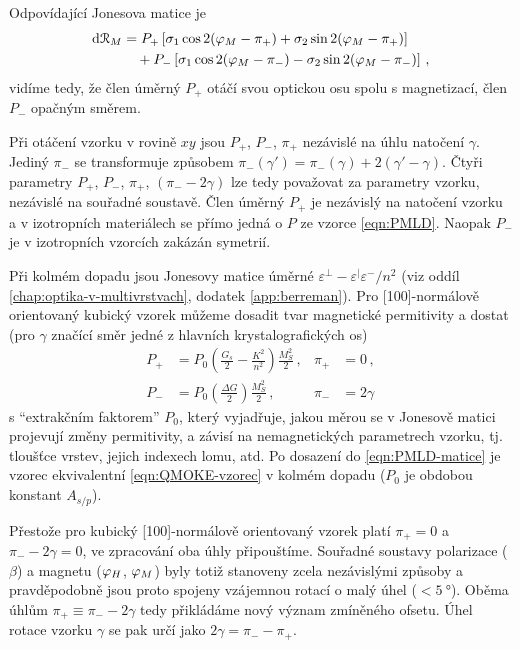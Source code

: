 Odpovídající Jonesova matice je 
\begin{equation}
    \label{eqn:dR-kubicky}
    \begin{split}
        \textrm{d}\mathcal{R}_M &= P_+ \left[\sigma_1\cos2(\varphi_M-\pi_+) + \sigma_2 \sin2(\varphi_M-\pi_+)\right] \\ 
                              & \quad+ P_- \left[\sigma_1\cos2(\varphi_M-\pi_-) - \sigma_2 \sin2(\varphi_M-\pi_-) \right] \,,
\end{split}
\end{equation}
vidíme tedy, že člen úměrný $P_+$ otáčí svou optickou osu spolu s magnetizací, člen $P_-$ opačným směrem.

Při otáčení vzorku v rovině $xy$ jsou $P_+$, $P_-$, $\pi_+$ nezávislé na úhlu natočení $\gamma$.
Jediný $\pi_-$ se transformuje způsobem $\pi_-(\gamma')=\pi_-(\gamma)+2(\gamma'-\gamma)$.
Čtyři parametry $P_+$, $P_-$, $\pi_+$, $(\pi_--2\gamma)$ lze tedy považovat za parametry vzorku, nezávislé na souřadné soustavě.
Člen úměrný $P_+$ je nezávislý na natočení vzorku a v izotropních materiálech se přímo jedná o $P$ ze vzorce \ref{eqn:PMLD}.
Naopak $P_-$ je v izotropních vzorcích zakázán symetrií.

Při kolmém dopadu jsou Jonesovy matice úměrné $\varepsilon^\perp-\varepsilon^\vert\varepsilon^-/n^2$ (viz oddíl \ref{chap:optika-v-multivrstvach}, dodatek \ref{app:berreman}).
Pro [100]-normálově orientovaný kubický vzorek můžeme dosadit tvar magnetické permitivity a dostat (pro $\gamma$ značící směr jedné z hlavních krystalografických os)
\begin{subequations}
    \label{eqn:PMLD-kubicke}
\begin{align}
    P_+ &= P_0 \left(\frac{G_s}{2} - \frac{K^2}{n^2}\right) \frac{M_S^2}{2} \,, & \pi_+ &=0 \,,\\
    P_- &= P_0 \left(\frac{\Delta G}{2}\right) \frac{M_S^2}{2} \,, & \pi_- &=2\gamma
\end{align}
\end{subequations}
s ``extrakčním faktorem'' $P_0$, který vyjadřuje, jakou měrou se v Jonesově matici projevují změny permitivity, a závisí na nemagnetických parametrech vzorku, tj. tloušťce vrstev, jejich indexech lomu, atd.
Po dosazení do \eqref{eqn:PMLD-matice} je vzorec ekvivalentní \eqref{eqn:QMOKE-vzorec} v kolmém dopadu ($P_0$ je obdobou konstant $A_{s/p}$).

Přestože pro kubický [100]-normálově orientovaný vzorek platí $\pi_+=0$ a $\pi_--2\gamma=0$, ve zpracování oba úhly připouštíme.
Souřadné soustavy polarizace ($\beta$) a magnetu ($\varphi_H$, $\varphi_M$) byly totiž stanoveny zcela nezávislými způsoby a pravděpodobně jsou proto spojeny vzájemnou rotací o malý úhel ($<\SI{5}{\degree}$).
Oběma úhlům $\pi_+ \equiv \pi_--2\gamma$ tedy přikládáme nový význam zmíněného ofsetu.
Úhel rotace vzorku $\gamma$ se pak určí jako $2\gamma = \pi_- - \pi_+$.

